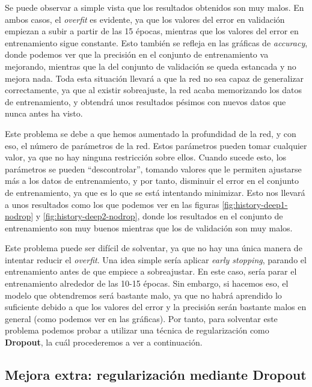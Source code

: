 \documentclass[11pt,a4paper]{article}
\begin{document}
Se puede observar a simple vista que los resultados obtenidos son muy malos. En ambos casos, el \textit{overfit} es
evidente, ya que los valores del error en validación empiezan a subir a partir de las 15 épocas, mientras que los valores
del error en entrenamiento sigue constante. Esto también se refleja en las gráficas de \textit{accuracy}, donde podemos
ver que la precisión en el conjunto de entrenamiento va mejorando, mientras que la del conjunto de validación se queda
estancada y no mejora nada. Toda esta situación llevará a que la red no sea capaz de generalizar correctamente, ya que al
existir sobreajuste, la red acaba memorizando los datos de entrenamiento, y obtendrá unos resultados pésimos con nuevos
datos que nunca antes ha visto.

Este problema se debe a que hemos aumentado la profundidad de la red, y con eso, el número de parámetros de la red.
Estos parámetros pueden tomar cualquier valor, ya que no hay ninguna restricción sobre ellos.
Cuando sucede esto, los parámetros se pueden ``descontrolar'', tomando valores que le permiten ajustarse
más a los datos de entrenamiento, y por tanto, disminuir el error en el conjunto de entrenamiento, ya que es lo que
se está intentando minimizar. Esto nos llevará a unos resultados como los que podemos ver en las figuras
\ref{fig:history-deep1-nodrop} y \ref{fig:history-deep2-nodrop}, donde los resultados en el conjunto de entrenamiento
son muy buenos mientras que los de validación son muy malos.

Este problema puede ser difícil de solventar, ya que no hay una única manera de intentar reducir el \textit{overfit}.
Una idea simple sería aplicar \textit{early stopping}, parando el entrenamiento antes de que empiece a sobreajustar.
En este caso, sería parar el entrenamiento alrededor de las 10-15 épocas. Sin embargo, si hacemos eso, el modelo que
obtendremos será bastante malo, ya que no habrá aprendido lo suficiente debido a que los valores del error y la precisión
serán bastante malos en general (como podemos ver en las gráficas). Por tanto, para solventar este problema podemos probar
a utilizar una técnica de regularización como \textbf{Dropout}, la cuál procederemos a ver a continuación.

\subsection{Mejora extra: regularización mediante Dropout}
\end{document}
